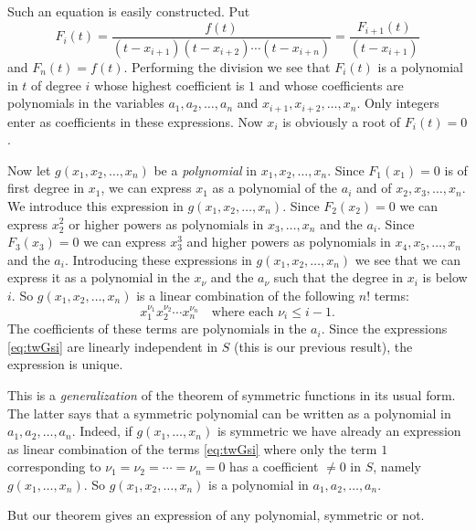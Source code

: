\documentclass[10pt,leqno,a5paper]{book}
\theoremstyle{definition}
\begin{document}
Such an equation is easily constructed.
Put
\begin{equation}
\label{eq:twGfi}
F_i(t)
= \frac{f(t)}{(t-x_{i+1})(t-x_{i+2}) \cdots (t-x_{i+n})}
= \frac{F_{i+1}(t)}{(t-x_{i+1})}
\end{equation}
and $F_n(t) = f(t)$.
Performing the division we see that $F_i(t)$ is a polynomial in $t$ of degree $i$ whose highest coefficient is $1$ and whose coefficients are polynomials in the variables $a_1, a_2, \ldots, a_n$ and $x_{i+1}, x_{i+2}, \ldots, x_n$.
Only integers enter as coefficients in these expressions.
Now $x_i$ is obviously a root of $F_i(t) = 0$.

Now let $g(x_1, x_2, \ldots, x_n)$ be a \emph{polynomial} in $x_1, x_2, \ldots, x_n$.
Since $F_1(x_1) = 0$ is of first degree in $x_1$, we can express $x_1$ as a polynomial of the $a_i$ and of $x_2, x_3, \ldots, x_n$.
We introduce this expression in $g(x_1,x_2,\ldots,x_n)$.
Since $F_2(x_2) = 0$ we can express $x_2^2$ or higher powers as polynomials in $x_3, \ldots, x_n$ and the $a_i$.
Since $F_3(x_3) = 0$ we can express $x_3^3$ and higher powers as polynomials in $x_4, x_5, \ldots, x_n$ and the $a_i$.
Introducing these expressions in $g(x_1, x_2, \ldots, x_n)$ we see that we can express it as a polynomial in the $x_\nu$ and the $a_\nu$ such that the degree in $x_i$ is below $i$.
So $g(x_1, x_2, \ldots, x_n)$ is a linear combination of the following $n!$ terms:
\begin{equation}
\label{eq:twGsi}
x_1^{\nu_1} x_2^{\nu_2} \cdots x_n^{\nu_n}
\quad
\text{where each $\nu_i \leq i-1$.}
\end{equation}
The coefficients of these terms are polynomials in the $a_i$.
Since the expressions \eqref{eq:twGsi} are linearly independent in $S$ (this is our previous result), the expression is unique.

This is a \emph{generalization} of the theorem of symmetric functions in its usual form.
The latter says that a symmetric polynomial can be written as a polynomial in $a_1, a_2, \ldots, a_n$.
Indeed, if $g(x_1, \ldots, x_n)$ is symmetric we have already an expression as linear combination of the terms \eqref{eq:twGsi} where only the term $1$ corresponding to $\nu_1 = \nu_2 = \cdots = \nu_n = 0$ has a coefficient $\not= 0$ in $S$, namely $g(x_1, \ldots, x_n)$.
So $g(x_1, x_2, \ldots, x_n)$ is a polynomial in $a_1, a_2, \ldots, a_n$.

But our theorem gives an expression of any polynomial, symmetric or not.
\end{document}
